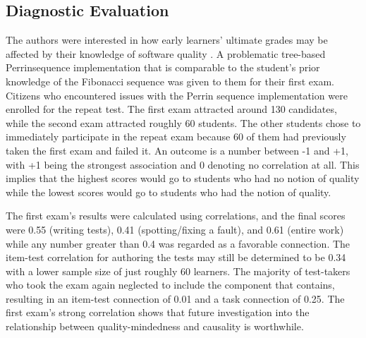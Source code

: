 \subsection{Diagnostic Evaluation}
The authors were interested in how early learners' ultimate grades may be affected by their knowledge of software quality \cite{ref38}. A problematic tree-based Perrinsequence implementation that is comparable to the student’s prior knowledge of the Fibonacci sequence was given to them for their first exam. Citizens who encountered issues with the Perrin sequence implementation were enrolled for the repeat test. The first exam attracted around 130 candidates, while the second exam attracted roughly 60 students. The other students chose to immediately participate in the repeat exam because 60 of them had previously taken the first exam and failed it. An outcome is a number between -1 and +1, with +1 being the strongest association and 0 denoting no correlation at all. This implies that the highest scores would go to students who had no notion of quality while the lowest scores would go to students who had the notion of quality.\par 
The first exam's results were calculated using correlations, and the final scores were 0.55 (writing tests), 0.41 (spotting/fixing a fault), and 0.61 (entire work) while any number greater than 0.4 was regarded as a favorable connection. The item-test correlation for authoring the tests may still be determined to be 0.34 with a lower sample size of just roughly 60 learners. The majority of test-takers who took the exam again neglected to include the component that contains, resulting in an item-test connection of 0.01 and a task connection of 0.25. The first exam's strong correlation shows that future investigation into the relationship between quality-mindedness and causality is worthwhile.
